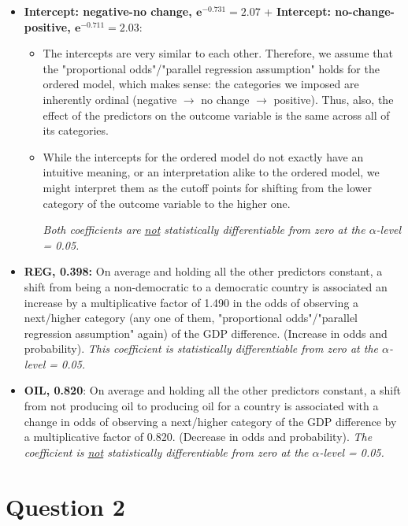 \documentclass[12pt,letterpaper]{article}
\begin{document}
\begin{itemize}
	\item \textbf{Intercept: negative-no change, \( \mathbf{e^{-0.731} = 2.07} \)} + \textbf{Intercept: no-change-positive, \( \mathbf{e^{-0.711} = 2.03} \)}: 
 \begin{itemize}
        \item The intercepts are very similar to each other. Therefore, we assume that the "proportional odds"/"parallel regression assumption" holds for the ordered model, which makes sense: the categories we imposed are inherently ordinal (negative $\rightarrow$ no change $\rightarrow$ positive). Thus, also, the effect of the predictors on the outcome variable is the same across all of its categories. 
        \item While the intercepts for the ordered model do not exactly have an intuitive meaning, or an interpretation alike to the ordered model, we might interpret them as the cutoff points for shifting from the lower category of the outcome variable to the higher one.
        
        \textit{Both coefficients are \underline{not} statistically differentiable from zero at the $\alpha$-level = 0.05.}
    \end{itemize} 
 
	\item \textbf{REG, 0.398:} On average and holding all the other predictors constant, a shift from being a non-democratic to a democratic country is associated an increase by a multiplicative factor of 1.490 in the odds of observing a next/higher category (any one of them, "proportional odds"/"parallel regression assumption" again) of the GDP difference. (Increase in odds and probability).
\textit{This coefficient is statistically differentiable from zero at the $\alpha$-level = 0.05.  }
	\item \textbf{OIL, 0.820}: On average and holding all the other predictors constant, a shift from not producing oil to producing oil for a country is associated with a change in odds of observing a next/higher category of the GDP difference by a multiplicative factor of 0.820. (Decrease in odds and probability). \textit{The coefficient is \underline{not} statistically differentiable from zero at the $\alpha$-level = 0.05.}
\end{itemize}

\section*{Question 2} 
\vspace{.25cm}
\end{document}

